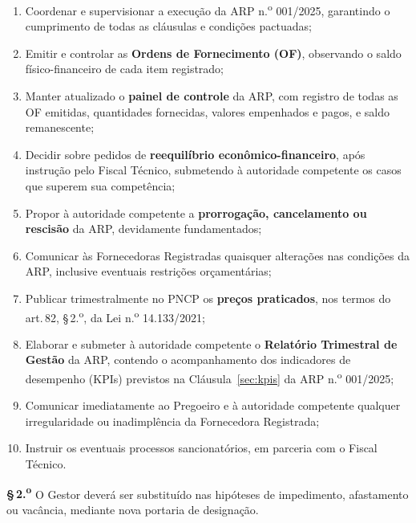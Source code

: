 \documentclass[12pt,a4paper]{article}
\newcommand{\art}[1]{art.\,#1}
\newcommand{\paragrafo}[2]{%
  \par\noindent\textbf{\S\,#1.\textsuperscript{o}} #2}
\newcommand{\arpRef}{ARP n.\textsuperscript{o} 001/2025}
\begin{document}
\begin{enumerate}[label=\Roman*.]
  \item Coordenar e supervisionar a execução da \arpRef, garantindo o cumprimento
    de todas as cláusulas e condições pactuadas;

  \item Emitir e controlar as \textbf{Ordens de Fornecimento (OF)}, observando
    o saldo físico-financeiro de cada item registrado;

  \item Manter atualizado o \textbf{painel de controle} da ARP, com registro de
    todas as OF emitidas, quantidades fornecidas, valores empenhados e pagos,
    e saldo remanescente;

  \item Decidir sobre pedidos de \textbf{reequilíbrio econômico-financeiro},
    após instrução pelo Fiscal Técnico, submetendo à autoridade competente
    os casos que superem sua competência;

  \item Propor à autoridade competente a \textbf{prorrogação, cancelamento ou
    rescisão} da ARP, devidamente fundamentados;

  \item Comunicar às Fornecedoras Registradas quaisquer alterações nas condições
    da ARP, inclusive eventuais restrições orçamentárias;

  \item Publicar trimestralmente no PNCP os \textbf{preços praticados}, nos
    termos do \art{82}, \S\,2.\textsuperscript{o}, da Lei n.\textsuperscript{o}
    14.133/2021;

  \item Elaborar e submeter à autoridade competente o \textbf{Relatório
    Trimestral de Gestão} da ARP, contendo o acompanhamento dos indicadores
    de desempenho (KPIs) previstos na Cláusula~\ref*{sec:kpis} da \arpRef;

  \item Comunicar imediatamente ao Pregoeiro e à autoridade competente qualquer
    irregularidade ou inadimplência da Fornecedora Registrada;

  \item Instruir os eventuais processos sancionatórios, em parceria com o
    Fiscal Técnico.
\end{enumerate}

\paragrafo{2}{O Gestor deverá ser substituído nas hipóteses de impedimento,
afastamento ou vacância, mediante nova portaria de designação.}
\end{document}
